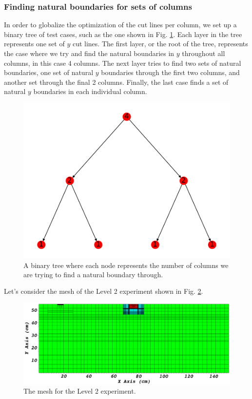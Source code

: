 \FloatBarrier
\subsubsection{Finding natural boundaries for sets of columns}
In order to globalize the optimization of the cut lines per column, we set up a binary tree of test cases, such as the one shown in Fig. \ref{binary_tree}. Each layer in the tree represents one set of $y$ cut lines. The first layer, or the root of the tree, represents the case where we try and find the natural boundaries in $y$ throughout all columns, in this case 4 columns. The next layer tries to find two sets of natural boundaries, one set of natural $y$ boundaries through the first two columns, and another set through the final 2 columns. Finally, the last case finds a set of natural $y$ boundaries in each individual column. 

\begin{figure}[h]
\centering
\includegraphics[scale=0.75]{../figures/binary_tree.pdf}
\caption{A binary tree where each node represents the number of columns we are trying to find a natural boundary through.}
\label{binary_tree}
\end{figure}

Let's consider the mesh of the Level 2 experiment shown in Fig. \ref{level2_nocut}. 

\begin{figure}[h]
\centering
\includegraphics[scale=0.3]{../../figures/level2_nocut.png}
\caption{The mesh for the Level 2 experiment.}
\label{level2_nocut}
\end{figure}

